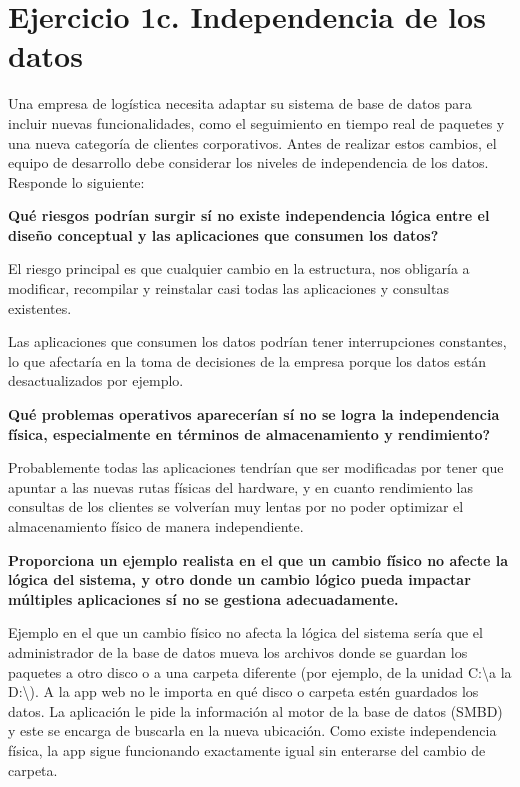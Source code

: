 
\section*{Ejercicio 1c. Independencia de los datos}
Una empresa de logística necesita adaptar su sistema de base de datos para incluir nuevas funcionalidades, como el seguimiento en tiempo real de paquetes y una nueva categoría de clientes corporativos. Antes de realizar estos cambios, el equipo de desarrollo debe considerar los niveles de independencia de los datos. Responde lo siguiente:

\textbf{Qué riesgos podrían surgir sí no existe independencia lógica entre el diseño conceptual y las aplicaciones que consumen los datos?}


El riesgo principal es que cualquier cambio en la estructura, nos obligaría a modificar, recompilar y reinstalar casi todas las aplicaciones y consultas existentes.

Las aplicaciones que consumen los datos podrían tener interrupciones constantes, lo que afectaría en la toma de decisiones de la empresa porque los datos están desactualizados por ejemplo.

\textbf{Qué problemas operativos aparecerían sí no se logra la independencia física, especialmente en términos de almacenamiento y rendimiento?}


Probablemente todas las aplicaciones tendrían que ser modificadas por tener que apuntar a las nuevas rutas físicas del hardware, y en cuanto rendimiento las consultas de los clientes se volverían muy lentas por no poder optimizar el almacenamiento físico de manera independiente.

\textbf{Proporciona un ejemplo realista en el que un cambio físico no afecte la lógica del sistema, y otro donde un cambio lógico pueda impactar múltiples aplicaciones sí no se gestiona adecuadamente.}


Ejemplo en el que un cambio físico no afecta la lógica del sistema sería que el administrador de la base de datos mueva los archivos donde se guardan los paquetes a otro disco o a una carpeta diferente (por ejemplo, de la unidad C:\textbackslash a la D:\textbackslash). A la app web no le importa en qué disco o carpeta estén guardados los datos. La aplicación le pide la información al motor de la base de datos (SMBD) y este se encarga de buscarla en la nueva ubicación. Como existe independencia física, la app sigue funcionando exactamente igual sin enterarse del cambio de carpeta.

